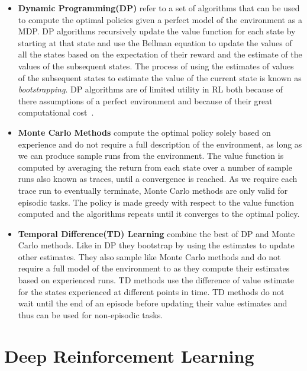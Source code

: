 \begin{itemize}
	\item \textbf{Dynamic Programming(DP)} refer to a set of algorithms that can be used to compute the optimal policies given a perfect model of the environment as a MDP. DP algorithms recursively update the value function for each state by starting at that state and use the Bellman equation to update the values of all the states based on the expectation of their reward and the estimate of the values of the subsequent states. The process of using the estimates of values of the subsequent states to estimate the value of the current state is known as \emph{bootstrapping}. DP algorithms are of limited utility in RL both because of there assumptions of a perfect environment and because of their great computational cost~\cite{sutton2018reinforcement}.
	
	\item \textbf{Monte Carlo Methods} compute the optimal policy solely based on experience and do not require a full description of the environment, as long as we can produce sample runs from the environment. The value function is computed by averaging the return from each state over a number of sample runs also known as traces, until a convergence is reached. As we require each trace run to eventually terminate, Monte Carlo methods are only valid for episodic tasks. The policy is made greedy with respect to the value function computed and the algorithms repeats until it converges to the optimal policy.
	
	
	\item \textbf{Temporal Difference(TD) Learning} combine the best of DP and Monte Carlo methods. Like in DP they bootstrap by using the estimates to update other estimates. They also sample like Monte Carlo methods and do not require a full model of the environment to as they compute their estimates based on experienced runs. TD methods use the difference of value estimate for the states experienced at different points in time. TD methods do not wait until the end of an episode before updating their value estimates and thus can be used for non-episodic tasks.  
\end{itemize}

\section{Deep Reinforcement Learning}